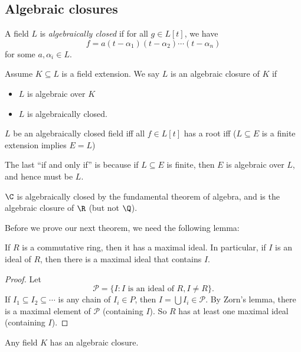 \documentclass[a4paper]{article}
\begin{document}
\subsection{Algebraic closures}

\begin{defi}
  A field $L$ is \emph{algebraically closed} if for all $g\in L[t]$, we have
  \[
    f = a(t - \alpha_1)(t - \alpha_2) \cdots (t - \alpha_n)
  \]
  for some $a, \alpha_i \in L$.

  Assume $K\subseteq L$ is a field extension. We say $L$ is an algebraic closure of $K$ if
  \begin{itemize}
    \item $L$ is algebraic over $K$
    \item $L$ is algebraically closed.
  \end{itemize}
\end{defi}

\begin{eg}
  $L$ be an algebraically closed field iff all $f\in L[t]$ has a root iff ($L\subseteq E$ is a finite extension implies $E = L$)
\end{eg}
The last ``if and only if'' is because if $L \subseteq E$ is finite, then $E$ is algebraic over $L$, and hence must be $L$.

\begin{eg}
  $\C$ is algebraically closed by the fundamental theorem of algebra, and is the algebraic closure of $\R$ (but not $\Q$).
\end{eg}

Before we prove our next theorem, we need the following lemma:
\begin{lemma}
  If $R$ is a commutative ring, then it has a maximal ideal. In particular, if $I$ is an ideal of $R$, then there is a maximal ideal that contains $I$.
\end{lemma}

\begin{proof}
  Let
  \[
    \mathcal{P} = \{I: I\text{ is an ideal of }R, I \not= R\}.
  \]
  If $I_1 \subseteq I_2 \subseteq \cdots$ is any chain of $I_i \in P$, then $I = \bigcup I_i \in \mathcal{P}$. By Zorn's lemma, there is a maximal element of $\mathcal{P}$ (containing $I$). So $R$ has at least one maximal ideal (containing $I$).
\end{proof}

\begin{thm}
  Any field $K$ has an algebraic closure.
\end{thm}
\end{document}
